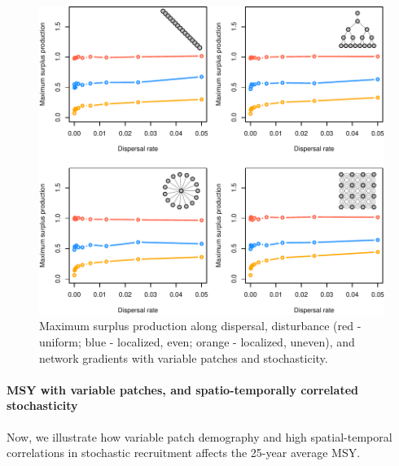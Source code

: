 \documentclass[
]{article}
\begin{document}
\begin{figure}[H]

{\centering \includegraphics{Managing_for_ecological_surprises_in_metapopulations_files/figure-latex/MSY with variable patches and stochasticity-1} 

}

\caption{Maximum surplus production along dispersal, disturbance (red - uniform; blue - localized, even; orange - localized, uneven), and network gradients with variable patches and stochasticity.}\label{fig:MSY with variable patches and stochasticity}
\end{figure}
\newpage

\hypertarget{msy-with-variable-patches-and-spatio-temporally-correlated-stochasticity}{%
\paragraph{MSY with variable patches, and spatio-temporally correlated
stochasticity}\label{msy-with-variable-patches-and-spatio-temporally-correlated-stochasticity}}

Now, we illustrate how variable patch demography and high
spatial-temporal correlations in stochastic recruitment affects the
25-year average MSY.
\end{document}

